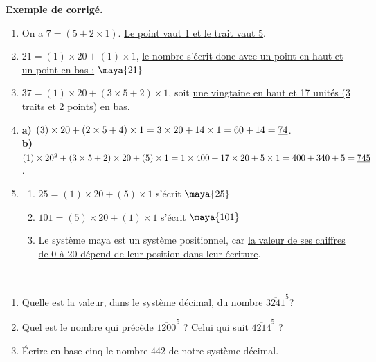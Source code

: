 \begin{activite}
\bigskip

\textcolor{G1}{
{\bf Exemple de corrigé.} \smallskip
\begin{enumerate}
   \item On a $7 =(5+2\times1)$. \uline{Le point vaut 1 et le trait vaut 5}.      
   \item $21 =(1)\times20+(1)\times1$, \uline{le nombre s'écrit donc avec un point en haut et un point en bas :} \; {\Large$\maya{21}$}   
   \item $37 =(1)\times20+(3\times5+2)\times1$, soit \uline{une vingtaine en haut et 17 unités (3 traits et 2 points) en bas}.     
   \item 
      \textcolor{B1}{\bf a)} $(3)\times20+(2\times5+4)\times1 =3\times20+14\times1 =60+14 =\uline{74}$. \\      
      \textcolor{B1}{\bf b)} $(1)\times20^2+(3\times5+2)\times20+(5)\times1 =1\times400+17\times20+5\times1 =400+340+5 =\uline{745}$. \smallskip
   \item 
      \begin{enumerate}
         \item $25 =(1)\times20+(5)\times1$ s'écrit {\Large$\maya{25}$} \smallskip
         \item $101 =(5)\times20+(1)\times1$ s'écrit {\Large$\maya{101}$} \smallskip
         \item Le système maya est un système positionnel, car \uline{la valeur de ses \og chiffres \fg{} de 0 à 20 dépend de leur position dans leur écriture}.
      \end{enumerate}
\end{enumerate}}
\end{activite}


\exercicesbase


\begin{exercice} %
\ \\ [-10mm]
   \begin{enumerate} 
      \item Quelle est la valeur, dans le système décimal, du nombre $\overline{3241}^5$?
      \item Quel est le nombre qui précède $\overline{1200}^5$ ? Celui qui suit $\overline{4214}^5$ ?
      \item Écrire en base cinq le nombre 442 de notre système décimal.
   \end{enumerate}
\end{exercice}

